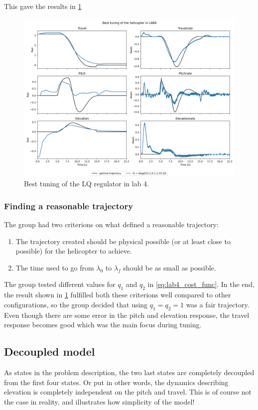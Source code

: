 \documentclass[../main.tex]{subfiles}
\begin{document}
This gave the results in \cref{fig:LAB4_best_tuning}
\begin{figure}[h]
	\centering
	\includegraphics[width=\linewidth]{figures/LAB4_best_tunings.png}
	\caption{Best tuning of the LQ regulator in lab 4.}
	\label{fig:LAB4_best_tuning}
\end{figure}

\subsubsection{Finding a reasonable trajectory}
The group had two criterions on what defined a reasonable trajectory:
\begin{enumerate}
	\item The trajectory created should be physical possible (or at least close to possible) for the helicopter to achieve.
	\item The time used to go from $ \lambda_0 $ to $ \lambda_f $ should be as small as possible.
\end{enumerate}
The group tested different values for $ q_1 $ and $ q_2 $ in \cref{eq:lab4_cost_func}. In the end, the result shown in \cref{fig:LAB4_best_tuning} fulfilled both these criterions well compared to other configurations, so the group decided that using $ q_1 = q_2 = 1 $ was a fair trajectory. Even though there are some error in the pitch and elevation response, the travel response becomes good which was the main focus during tuning.

\subsection{Decoupled model} \label{sec:lab4_decoupled}
As states in the problem description, the two last states are completely decoupled from the first four states. Or put in other words, the dynamics describing elevation is completely independent on the pitch and travel. This is of course not the case in reality, and illustrates how simplicity of the model!
\end{document}
